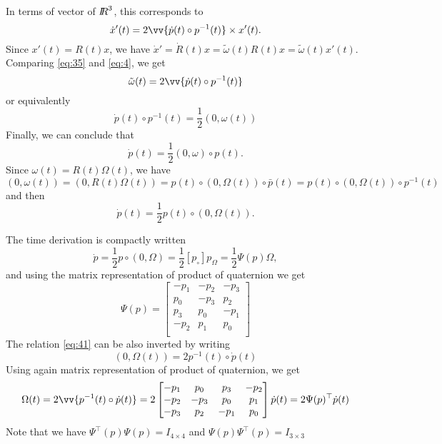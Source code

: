 In terms of vector of $\mbox{\rm $I\!\!R$}^3$, this corresponds to
\begin{equation}
  \label{eq:4}
  \dot x'(t) = 2 \vv{ \dot p(t) \circ p^{-1}(t) } \times x'(t).
\end{equation}
Since $x'(t) = R(t) x$, we have $\dot x' = \dot R(t) x = \tilde \omega(t) R(t) x  = \tilde \omega(t) x'(t) $. Comparing \eqref{eq:35} and \eqref{eq:4}, we get
\begin{equation}
  \label{eq:37}
  \tilde \omega(t) = 2 \vv{ \dot p(t) \circ p^{-1}(t) } 
\end{equation}
or equivalently
\begin{equation}
  \dot p(t) \circ p^{-1}(t) = \frac 1 2 (0, \omega(t) )
  \label{eq:38}
\end{equation}
Finally, we can conclude that
\begin{equation}
  \label{eq:39}
  \dot p(t) =\frac 1 2 (0, \omega ) \circ p(t).
\end{equation}
Since $\omega(t)=R(t)\Omega(t)$, we have
\begin{equation}
  \label{eq:40}
  (0, \omega(t) ) = (0, R(t) \Omega(t) ) = p(t) \circ (0, \Omega(t) ) \circ \bar p(t) = p(t) \circ (0, \Omega(t) ) \circ  p^{-1}(t)
\end{equation}
and then
\begin{equation}
  \label{eq:41}
  \dot p(t) =\frac 1 2 p(t) \circ(0, \Omega(t) ) .
\end{equation}

The time derivation is compactly written
\begin{equation}
  \label{eq:3}
  \dot p = \frac  1 2 p  \circ(0, \Omega ) = \frac 1 2 [p_\circ] p_{\Omega} = \frac 1 2 \Psi(p)\Omega ,
\end{equation}
and using the matrix representation of product of  quaternion
we get
\begin{equation}
  \label{eq:27}
  \Psi(p) =  \begin{bmatrix}
    -p_1 & -p_2 & -p_3 \\
    p_0 & -p_3 & p_2 \\
    p_3 & p_0 & -p_1 \\
    -p_2 & p_1 & p_0 \\
  \end{bmatrix}
\end{equation}
The relation \eqref{eq:41} can be also inverted by writing
\begin{equation}
  \label{eq:42}
   (0, \Omega(t) ) = 2 p^{-1}(t) \circ \dot p(t)
\end{equation}
Using again  matrix representation of product of  quaternion, we get 
\begin{equation}
  \label{eq:42}
  \Omega(t)  = 2 \vv{p^{-1}(t) \circ \dot p(t)}  = 2  \begin{bmatrix}
    -p_1 & p_0 & p_3 & -p_2 \\
    -p_2 & -p_3 & p_0 & p_1 \\
    -p_3 & p_2 & -p_1  & p_0\\
  \end{bmatrix}\dot p(t) = 2 \Psi(p)^\top \dot p(t)
\end{equation}
Note that we have $\Psi^\top(p)\Psi(p)= I_{4\times 4 }$ and  $\Psi(p)\Psi^\top(p)= I_{3\times 3 }$ 
